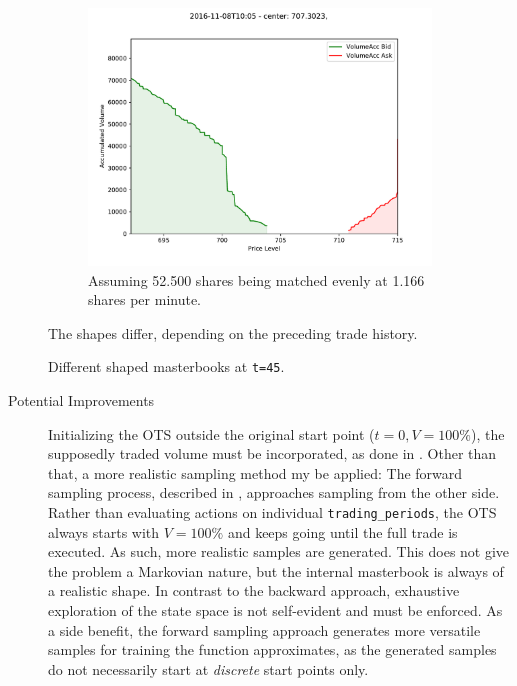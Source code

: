 \begin{figure}[ht]
\begin{subfigure}[t]{0.3\textwidth}
    	\end{subfigure}%
	\begin{subfigure}[t]{0.3\textwidth}
        		\centering
        		\includegraphics[width=\textwidth]{content/drawings/masterbook_customstart_SimEqual}
        		\caption{Assuming 52.500 shares being matched evenly at 1.166 shares per minute.}
		\label{fig:differingmasterbooks:SimEq}
    	\end{subfigure}%

	\caption{Different shaped masterbooks at \lstinline!t=45!.}
	The shapes differ, depending on the preceding trade history.
	\label{fig:differingmasterbooks}
\end{figure}

\begin{description}
\item[Potential Improvements] Initializing the \ac{OTS} outside the original start point ($t=0, V=100\%$), the supposedly traded volume must be incorporated, \eg as done in . Other than that, a more realistic sampling method my be applied: The forward sampling process, described in , approaches sampling from the other side. Rather than evaluating actions on individual \lstinline!trading_periods!, the \ac{OTS} always starts with $V=100 \% $ and keeps going until the full trade is executed. As such, more realistic samples are generated. This does not give the problem a Markovian nature, but the internal masterbook is always of a realistic shape. In contrast to the backward approach, exhaustive exploration of the state space is not self-evident and must be enforced.
As a side benefit, the forward sampling approach generates more versatile samples for training the function approximates, as the generated samples do not necessarily start at \emph{discrete} start points only.
\end{description}



